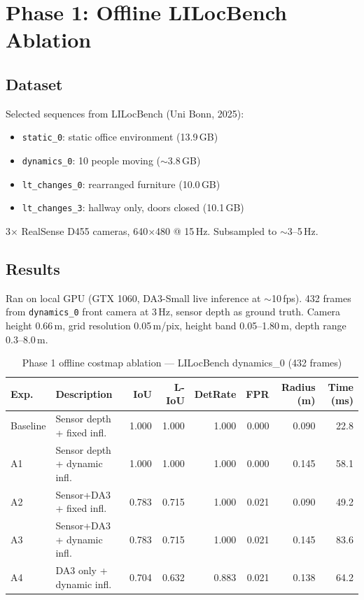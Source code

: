 \documentclass[11pt,a4paper]{article}
\begin{document}
\section{Phase 1: Offline LILocBench Ablation}
\label{sec:phase1-lilocbench}

\subsection{Dataset}

Selected sequences from LILocBench (Uni Bonn, 2025):

\begin{itemize}[nosep]
  \item \texttt{static\_0}: static office environment (13.9\,GB)
  \item \texttt{dynamics\_0}: 10 people moving ($\sim$3.8\,GB)
  \item \texttt{lt\_changes\_0}: rearranged furniture (10.0\,GB)
  \item \texttt{lt\_changes\_3}: hallway only, doors closed (10.1\,GB)
\end{itemize}

3$\times$ RealSense D455 cameras, 640$\times$480 @ 15\,Hz.
Subsampled to $\sim$3--5\,Hz.

\subsection{Results}

Ran on local GPU (GTX 1060, DA3-Small live inference at $\sim$10\,fps).
432 frames from \texttt{dynamics\_0} front camera at 3\,Hz, sensor depth
as ground truth.  Camera height 0.66\,m, grid resolution 0.05\,m/pix,
height band 0.05--1.80\,m, depth range 0.3--8.0\,m.

\begin{table}[h]
\centering
\caption{Phase 1 offline costmap ablation --- LILocBench dynamics\_0 (432 frames)}
\label{tab:phase1-lilocbench}
\begin{tabular}{llrrrrrr}
\toprule
\textbf{Exp.} & \textbf{Description} & \textbf{IoU} & \textbf{L-IoU}
  & \textbf{DetRate} & \textbf{FPR}
  & \textbf{Radius (m)} & \textbf{Time (ms)} \\
\midrule
Baseline & Sensor depth + fixed infl.       & 1.000 & 1.000 & 1.000 & 0.000 & 0.090 & 22.8 \\
A1       & Sensor depth + dynamic infl.      & 1.000 & 1.000 & 1.000 & 0.000 & 0.145 & 58.1 \\
A2       & Sensor+DA3 + fixed infl.          & 0.783 & 0.715 & 1.000 & 0.021 & 0.090 & 49.2 \\
A3       & Sensor+DA3 + dynamic infl.        & 0.783 & 0.715 & 1.000 & 0.021 & 0.145 & 83.6 \\
A4       & DA3 only + dynamic infl.          & 0.704 & 0.632 & 0.883 & 0.021 & 0.138 & 64.2 \\
\bottomrule
\end{tabular}
\end{table}
\end{document}
